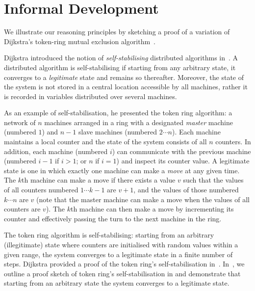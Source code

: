 \section{Informal Development}
\label{sec:intuition}

We illustrate our \colosl reasoning principles by sketching a proof of
a variation of Dijkstra's token-ring mutual exclusion
algorithm~\cite{dijkstra74}. 

Dijkstra introduced the notion of \emph{self-stabilising} distributed algorithms in~\cite{dijkstra74}. A distributed algorithm is self-stabilising if starting from any arbitrary state, it converges to a \emph{legitimate} state and remains so thereafter. Moreover, the state of the system is not stored in a central location accessible by all machines, rather it is recorded in variables distributed over several machines.
 
As an example of self-stabilisation, he presented the token ring algorithm: a network of $n$ machines arranged in a ring with a designated \emph{master} machine (numbered $1$) and $n-1$ slave machines (numbered $2 \cdots n$). Each machine maintains a local counter and the state of the system consists of all $n$ counters.
In addition, each machine (numbered $i$) can communicate with the previous machine (numbered $i-1$ if $i>1$; or $n$ if $i=1$) and inspect its counter value.
%
 A legitimate state is one in which exactly one machine can make a \emph{move} at any given time. The $k$th machine can make a move if there exists a value $v$ such that the values of all counters numbered $1\cdots k-1$ are $v+1$, and the values of those numbered $k\cdots n$ are $v$ (note that the master machine can make a move when the values of all counters are $v$). The $k$th machine can then make a move by incrementing its counter and effectively passing the turn to the next machine in the ring.
 
 The token ring algorithm is self-stabilising: starting from an arbitrary (illegitimate) state where counters are initialised with random values within a given range, the system converges to a legitimate state in a finite number of steps. Dijkstra provided a proof of the token ring's self-stabilisation in~\cite{dijkstra-proof}. In~\cite{colosl-tr14}, we outline a proof sketch of token ring's self-stabilisation in \colosl and demonstrate that starting from an arbitrary state the system converges to a legitimate state.
 

